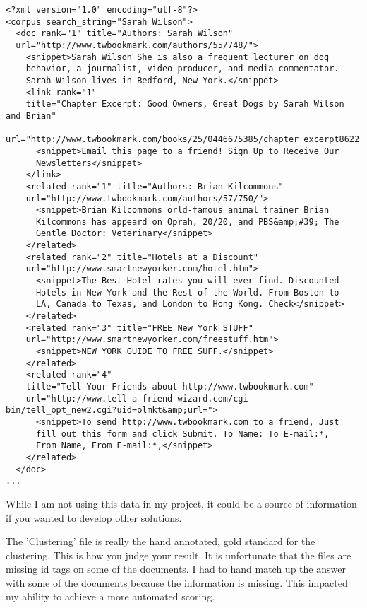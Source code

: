 \documentclass[12pt,twoside,letterpaper]{article}
\begin{document}
\begin{verbatim}
<?xml version="1.0" encoding="utf-8"?>
<corpus search_string="Sarah Wilson">
  <doc rank="1" title="Authors: Sarah Wilson"
  url="http://www.twbookmark.com/authors/55/748/">
    <snippet>Sarah Wilson She is also a frequent lecturer on dog
    behavior, a journalist, video producer, and media commentator.
    Sarah Wilson lives in Bedford, New York.</snippet>
    <link rank="1"
    title="Chapter Excerpt: Good Owners, Great Dogs by Sarah Wilson and Brian"
    url="http://www.twbookmark.com/books/25/0446675385/chapter_excerpt8622.html">
      <snippet>Email this page to a friend! Sign Up to Receive Our
      Newsletters</snippet>
    </link>
    <related rank="1" title="Authors: Brian Kilcommons"
    url="http://www.twbookmark.com/authors/57/750/">
      <snippet>Brian Kilcommons orld-famous animal trainer Brian
      Kilcommons has appeard on Oprah, 20/20, and PBS&amp;#39; The
      Gentle Doctor: Veterinary</snippet>
    </related>
    <related rank="2" title="Hotels at a Discount"
    url="http://www.smartnewyorker.com/hotel.htm">
      <snippet>The Best Hotel rates you will ever find. Discounted
      Hotels in New York and the Rest of the World. From Boston to
      LA, Canada to Texas, and London to Hong Kong. Check</snippet>
    </related>
    <related rank="3" title="FREE New York STUFF"
    url="http://www.smartnewyorker.com/freestuff.htm">
      <snippet>NEW YORK GUIDE TO FREE SUFF.</snippet>
    </related>
    <related rank="4"
    title="Tell Your Friends about http://www.twbookmark.com"
    url="http://www.tell-a-friend-wizard.com/cgi-bin/tell_opt_new2.cgi?uid=olmkt&amp;url=">
      <snippet>To send http://www.twbookmark.com to a friend, Just
      fill out this form and click Submit. To Name: To E-mail:*,
      From Name, From E-mail:*,</snippet>
    </related>
  </doc>
...
\end{verbatim}

While I am not using this data in my project, it could be a source of information if you wanted to develop other solutions.

The 'Clustering' file is really the hand annotated, gold standard for the clustering. This is how you judge your result. It is unfortunate that the files are missing id tags on some of the documents. I had to hand match up the answer with some of the documents because the information is missing. This impacted my ability to achieve a more automated scoring.
\end{document}
